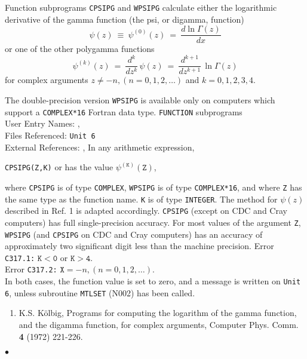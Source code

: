                        
                 
\Submitter{}                           
Function subprograms {\tt CPSIPG} and {\tt WPSIPG} calculate either
the logarithmic derivative of the gamma function (the psi, or
digamma, function)
$$ \psi(z) \ \equiv \ \psi^{(0)}(z) \ = \ \frac{d\ln \Gamma(z)} {dx}$$
or one of the other polygamma functions
$$ \psi^{(k)}(z) \ = \ \frac{d^k}{dz^k} \, \psi(z) \ = \
\frac{d^{k+1}}{dz^{k+1}} \, \ln \Gamma(z) $$
for complex arguments $ z \neq -n,(n=0,1,2,\ldots)$ and $k = 0,1,2,3,4$.
\par
The double-precision version {\tt WPSIPG} is available only on
computers which support a {\tt COMPLEX*16} Fortran data type.
\Structure
{\tt FUNCTION} subprograms\\
User Entry Names: ,  \\
Files Referenced: {\tt Unit 6} \\
External References: , 
\Usage
In any arithmetic expression,
\begin{center}
{\tt CPSIPG(Z,K)} \quad or  \quad has the value
\quad $\psi^{(\mathtt{K})}(\mathtt{Z})$,
\end{center}
where {\tt CPSIPG} is of type {\tt COMPLEX}, {\tt WPSIPG} is of type
{\tt COMPLEX*16}, and where {\tt Z} has the same type as the
function name. {\tt K} is of type {\tt INTEGER}.
\Method
The method for $\psi(z)$ described in Ref. 1 is adapted accordingly.
\Accuracy
{\tt CPSIPG} (except on CDC and Cray computers)
has full single-precision accuracy.
For most values of the argument {\tt Z}, {\tt WPSIPG}
(and {\tt CPSIPG} on CDC and Cray computers) has an accuracy of
approximately two significant digit less than the machine precision.
\Errorh
Error {\tt C317.1:} $\mathtt{K < 0}$ or $\mathtt{K > 4}$. \\
Error {\tt C317.2:} $\mathtt{X} = -n, (n=0,1,2,\ldots)$. \\
In both cases, the function value is set to zero, and a message is
written on {\tt Unit 6}, unless subroutine {\tt MTLSET} (N002) has
been called.
\Refer
\begin{enumerate}
\item K.S. K\"olbig, Programs for computing the logarithm of the gamma
function, and the digamma function, for complex arguments,
Computer Phys. Comm. {\bf 4} (1972) 221-226.
\end{enumerate}
$\bullet$
